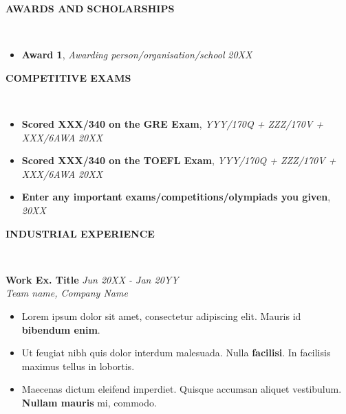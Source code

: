 \documentclass[9pt]{article}
\newenvironment{changemargin}[2]{%
  \begin{list}{}{%
    \setlength{\topsep}{0pt}%
    \setlength{\leftmargin}{#1}%
    \setlength{\rightmargin}{#2}%
    \setlength{\listparindent}{\parindent}%
    \setlength{\itemindent}{\parindent}%
    \setlength{\parsep}{\parskip}%
  }%
  \item[]}{\end{list}
}
\newcommand{\lineover}{
	\begin{changemargin}{-0.05in}{-0.05in}
		\vspace*{-8pt}
		\hrulefill \\
		\vspace*{-2pt}
	\end{changemargin}
}
\newcommand{\header}[1]{
	\begin{changemargin}{-0.7in}{-0.35in}
		\begin{large}
		\scshape{\textbf{#1}}\\
		\end{large}
  	\lineover
	\end{changemargin}
}
\newcommand{\jobdescription}[1]{
	\begin{changemargin}{0.05in}{0.05in}
    \smallskip
		{#1}
    \medskip
	\end{changemargin}
}
\newcommand{\jobtitle}[3]{
	\textbf{#1} \hfill \emph{#3}\\
	\emph{#2}
}
\newcommand{\PORtitle}[3]{
	\textbf{#1}, \emph{#2} \hfill \emph{#3}\\

}
\newenvironment{body} {
	\vspace*{-16pt}
	\begin{changemargin}{-0.65in}{-0.5in}
  }	
	{\end{changemargin}
}
\begin{document}
\medskip

\header{AWARDS AND SCHOLARSHIPS}
\begin{body}
	\vspace{14pt}
\begin{itemize}\itemsep -0pt 
        \item     \PORtitle{Award 1}{Awarding person/organisation/school}{20XX}

    
\end{itemize}

\end{body}

\medskip

\header{COMPETITIVE EXAMS}
\begin{body}
	\vspace{14pt}
\begin{itemize}\itemsep -0pt 
        \item \PORtitle{Scored XXX/340 on the GRE Exam}{YYY/170Q + ZZZ/170V + XXX/6AWA}{20XX}
        \item \PORtitle{Scored XXX/340 on the TOEFL Exam}{YYY/170Q + ZZZ/170V + XXX/6AWA}{20XX}

        \item \PORtitle{Enter any important exams/competitions/olympiads you given}{}{20XX}
    

\end{itemize}

\end{body}

\medskip


\header{INDUSTRIAL EXPERIENCE}

\begin{body}
	\vspace{14pt}

  \jobtitle{Work Ex. Title}{Team name, Company Name }{Jun 20XX - Jan 20YY}

   \jobdescription{
  	\begin{itemize} \itemsep -0pt  %
  		\item Lorem ipsum dolor sit amet, consectetur adipiscing elit. Mauris id \textbf{bibendum enim}. 
  		\item Ut feugiat nibh quis dolor interdum malesuada. Nulla \textbf{facilisi}. In facilisis maximus tellus in lobortis.  
  \item Maecenas dictum eleifend imperdiet. Quisque accumsan aliquet vestibulum. \textbf{Nullam mauris} mi, commodo. 
  	\end{itemize}
  }
\end{body}
\end{document}
